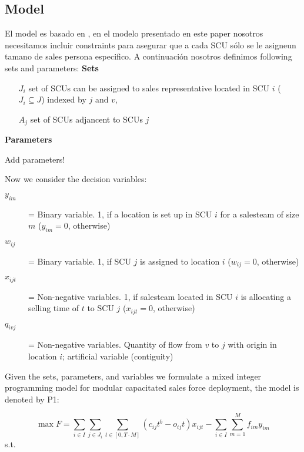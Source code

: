 \documentclass[12pt]{scrartcl}
\begin{document}
\subsection{Model}
El model es basado en \cite{Haase2014}, en el modelo presentado en este paper nosotros necesitamos incluir constraints para asegurar que a cada SCU sólo se le asigneun tamano de sales persona especifico. A continuación nosotros definimos following sets and parameters: 
\textbf{Sets}
\begin{itemize}
\setlength{\labelsep}{1em}
    \item[$J_i$] set of SCUs can be assigned to sales representative located in SCU $i$ ($J_i \subseteq J$) indexed by $j$ and $v$,
    \item[$A_j$] set of SCUs adjancent to SCUs $j$ 
\end{itemize}

\textbf{Parameters}

Add parameters!

Now we consider the decision variables: 

\begin{description}
	  \item[$y_{im}$]  = Binary variable. 1, if a location is set up in SCU $i$ for a salesteam of size $m$  ($y_{im} = 0$, otherwise)
  \item[$w_{ij}$] = Binary variable. 1, if SCU $j$ is assigned to location $i$ ($w_{ij} = 0$, otherwise)
  \item[$x_{ijt}$]  = Non-negative variables. 1, if salesteam located in SCU $i$ is allocating a selling time of $t$ to SCU $j$     ($x_{ijt} = 0$, otherwise)
  \item[$q_{ivj}$]= Non-negative variables. Quantity of flow from $v$ to $j$ with origin in location $i$; artificial variable (contiguity)
\end{description}

Given the sets, parameters, and variables we formulate a mixed integer programming model for modular capacitated sales force deployment, the model is denoted by P1:

\begin{equation}
     \max F = \sum_{i \in I} \sum_{j \in J_i} \sum_{t \in [0,T \cdot M]} (c_{ij}t^b - o_{ij}t)  x_{ijt} - \sum_{i \in I} \sum_{m=1}^{M} f_{im} y_{im}
     \label{eq:of}
\end{equation}
s.t.
\end{document}
